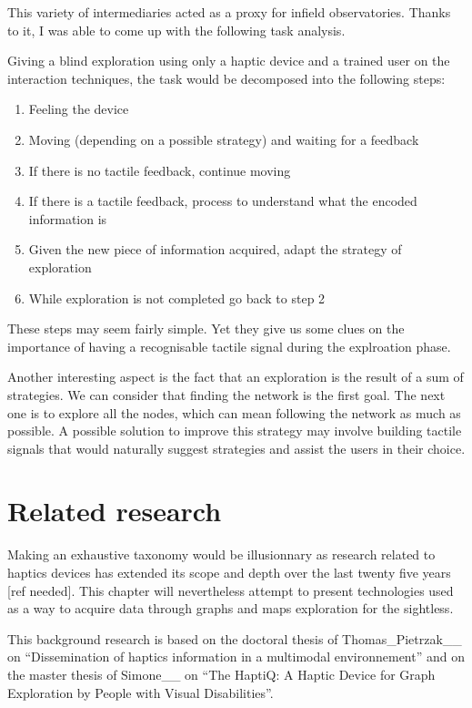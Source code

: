 This variety of intermediaries acted as a proxy for infield
observatories. Thanks to it, I was able to come up with the following
task analysis.

Giving a blind exploration using only a haptic device and a trained user
on the interaction techniques, the task would be decomposed into the
following steps:

\begin{enumerate}
\def\labelenumi{\arabic{enumi}.}
\item
  Feeling the device
\item
  Moving (depending on a possible strategy) and waiting for a feedback
\item
  If there is no tactile feedback, continue moving
\item
  If there is a tactile feedback, process to understand what the encoded
  information is
\item
  Given the new piece of information acquired, adapt the strategy of
  exploration
\item
  While exploration is not completed go back to step 2
\end{enumerate}

These steps may seem fairly simple. Yet they give us some clues on the
importance of having a recognisable tactile signal during the
explroation phase.

Another interesting aspect is the fact that an exploration is the result
of a sum of strategies. We can consider that finding the network is the
first goal. The next one is to explore all the nodes, which can mean
following the network as much as possible. A possible solution to
improve this strategy may involve building tactile signals that would
naturally suggest strategies and assist the users in their choice.

\section{Related research}\label{related-research}

Making an exhaustive taxonomy would be illusionnary as research related
to haptics devices has extended its scope and depth over the last twenty
five years {[}ref needed{]}. This chapter will nevertheless attempt to
present technologies used as a way to acquire data through graphs and
maps exploration for the sightless.

This background research is based on the doctoral thesis of
Thomas\_Pietrzak\_\_ on ``Dissemination of haptics information in a
multimodal environnement'' and on the master thesis of Simone\_\_ on
``The HaptiQ: A Haptic Device for Graph Exploration by People with
Visual Disabilities''.

